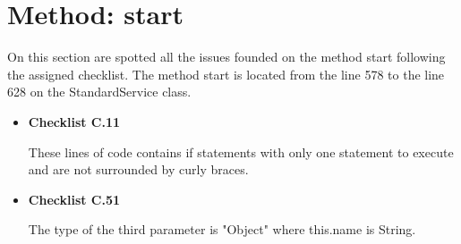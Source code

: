 \documentclass[../../../../codeInspection.tex]{subfiles}
\begin{document}
	\section{Method: start}

		On this section are spotted all the issues founded on the method start following the assigned checklist.
		The method start is located from the line 578 to the line 628 on the StandardService class.
		\begin{itemize}

			\item \textbf{Checklist C.11}

				  

				  

				  These lines of code contains if statements with only one statement to execute and are not surrounded by curly braces.

			\item \textbf{Checklist C.51}

				  

				  The type of the third parameter is "Object" where this.name is String.

		\end{itemize}
\end{document}
